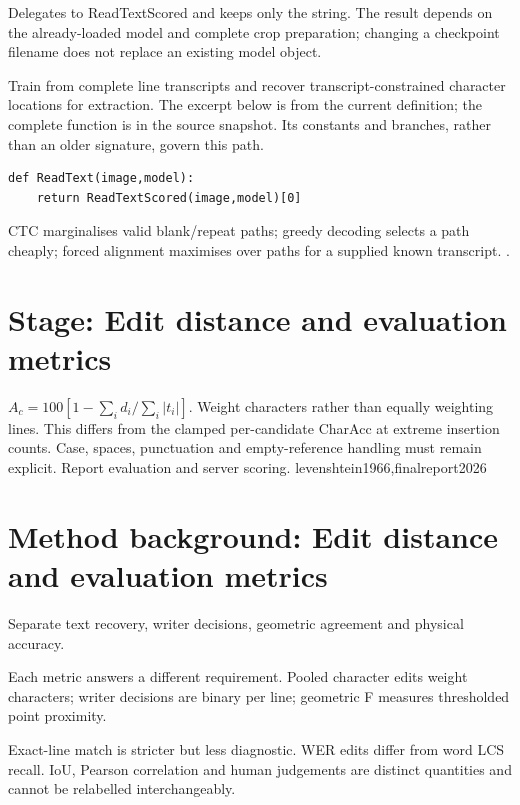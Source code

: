 Delegates to ReadTextScored and keeps only the string. The result depends on the already-loaded model and complete crop preparation; changing a checkpoint filename does not replace an existing model object.


Train from complete line transcripts and recover transcript-constrained character locations for extraction. The excerpt below is from the current definition; the complete function is in the source snapshot. Its constants and branches, rather than an older signature, govern this path.


\begin{lstlisting}[style=plain]
def ReadText(image,model):
    return ReadTextScored(image,model)[0]
\end{lstlisting}
CTC marginalises valid blank/repeat paths; greedy decoding selects a path cheaply; forced alignment maximises over paths for a supplied known transcript. \cite{graves2006,ctcdistill,torchctc}.


\section*{Stage: Edit distance and evaluation metrics}
{$A_c=100[1-\sum_i d_i/\sum_i|t_i|]$.}
{Weight characters rather than equally weighting lines. This differs from
the clamped per-candidate CharAcc at extreme insertion counts. Case, spaces,
punctuation and empty-reference handling must remain explicit.}
{Report evaluation and server scoring.}
{levenshtein1966,finalreport2026}


\section{Method background: Edit distance and evaluation metrics}\label{method:metrics}
Separate text recovery, writer decisions, geometric agreement and physical accuracy.


Each metric answers a different requirement. Pooled character edits weight characters; writer decisions are binary per line; geometric F measures thresholded point proximity.


Exact-line match is stricter but less diagnostic. WER edits differ from word LCS recall. IoU, Pearson correlation and human judgements are distinct quantities and cannot be relabelled interchangeably.



